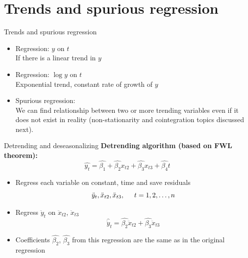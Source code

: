 \documentclass{beamer}
\begin{document}
\section{Trends and spurious regression}
\begin{frame}{Trends and spurious regression}
\begin{itemize}
\item Regression: $y$ on $t$ \\ If there is a linear trend in $y$
\vspace{0.5cm}
\item Regression: $\log{y}$ on $t$ \\ Exponential trend, constant rate of growth of $y$
\vspace{0.5cm}
\item Spurious regression: \\ \medskip We can find relationship between two or more trending variables even if it does not exist in reality (non-stationarity and cointegration topics discussed next).
\end{itemize}
\end{frame}
\begin{frame}{Detrending and deseasonalizing}
\textbf{Detrending algorithm (based on FWL theorem):}
$$\hat{y_t}=\hat{\beta_1}+\hat{\beta_2}x_{t2}+\hat{\beta_3}x_{t3}+\hat{\beta_4}t$$
\begin{itemize}
\item Regress each variable on constant, time and save residuals $$\ddot{y}_{t}, \ddot{x}_{t2}, \ddot{x}_{t3}, \hspace{0.5cm} t=1,2,\dots, n$$
\item Regress $\ddot{y}_{t}$ on $\ddot{x}_{t2}$, $\ddot{x}_{t3}$
$$\hat{\ddot{y}}_{t}=\hat{\beta_2}\ddot{x}_{t2}+\hat{\beta_3}\ddot{x}_{t3}$$
\item Coefficients $\hat{\beta_2}$, $\hat{\beta_3}$ from this regression are the same as in the original regression 
\end{itemize}
\end{frame}
\end{document}
